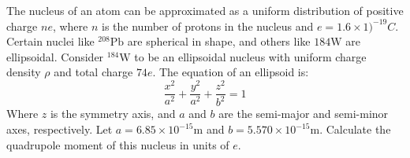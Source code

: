                 \begin{problem}
                    The nucleus of an atom can be approximated as a
                    uniform distribution of positive charge $ne$,
                    where $n$ is the number of protons in the nucleus and
                    $e=1.6\times{1)}^{-19}C$. Certain nuclei like
                    $^{208}\textrm{Pb}$ are spherical in shape, and
                    others like ${184}\textrm{W}$ are ellipsoidal.
                    Consider $^{184}\textrm{W}$ to be an ellipsoidal
                    nucleus with uniform charge density $\rho$ and
                    total charge $74e$. The equation of an ellipsoid is:
                    \begin{equation}
                        \frac{x^{2}}{a^{2}}+\frac{y^{2}}{a^{2}}
                                           +\frac{z^{2}}{b^{2}}=1
                    \end{equation}
                    Where $z$ is the symmetry axis, and $a$ and $b$
                    are the semi-major and semi-minor axes, respectively.
                    Let $a=6.85\times{10}^{-15}\textrm{m}$ and
                    $b=5.570\times{10}^{-15}\textrm{m}$. Calculate the
                    quadrupole moment of this nucleus in units of $e$.
                \end{problem}
